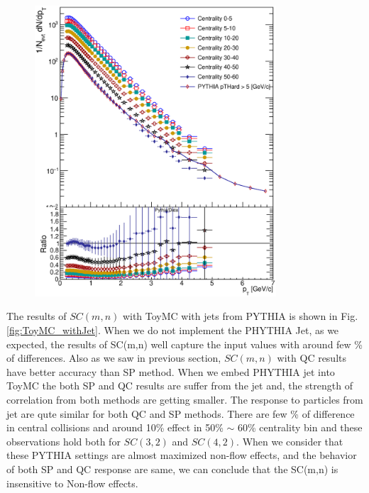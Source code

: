 	
\begin{figure}[h]
\centerline{\includegraphics[width=9.0cm]{figures/figs_ToyMC/ptspectra_bulkJet.eps}}
\caption{}
\label{fig:ToyMC_PYTHIAjet}
\end{figure}

	The results of $SC(m,n)$ with ToyMC with jets from PYTHIA is shown in Fig.\ref{fig:ToyMC_withJet}. When we do not implement the PHYTHIA Jet, as we expected, the results of SC(m,n) well capture the input values with around few \% of differences. Also as we saw in previous section, $SC(m,n)$ with QC results have better accuracy than SP method. When we embed PHYTHIA jet into ToyMC the both SP and QC results are suffer from the jet and, the strength of correlation from both methods are getting smaller. The response to particles from jet are qute  similar for both QC and SP methods. There are few \% of difference in central collisions and around 10\% effect in 50\% $\sim$ 60\% centrality bin and these observations hold both for $SC(3,2)$ and $SC(4,2)$. When we consider that these PYTHIA settings are almost maximized non-flow effects, and the behavior of both SP and QC response are same, we can conclude that the SC(m,n) is insensitive to Non-flow effects. 


